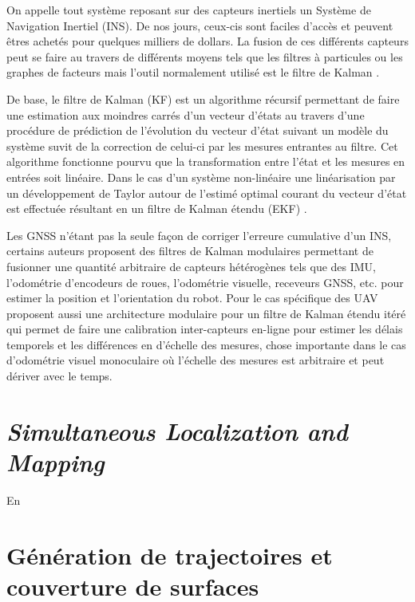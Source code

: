 On appelle tout système reposant sur des capteurs inertiels un Système de Navigation Inertiel (INS). De nos jours, ceux-cis sont faciles d'accès et peuvent êtres achetés pour quelques milliers de dollars. La fusion de ces différents capteurs peut se faire au travers de différents moyens tels que les filtres à particules \citep{Carvalho1997} ou les graphes de facteurs \citep{Indelman2012} mais l'outil normalement utilisé est le filtre de Kalman \citep{Noureldin2013}.

De base, le filtre de Kalman (KF) est un algorithme récursif permettant de faire une estimation aux moindres carrés d'un vecteur d'états au travers d'une procédure de prédiction de l'évolution du vecteur d'état suivant un modèle du système suvit de la correction de celui-ci par les mesures entrantes au filtre. Cet algorithme fonctionne pourvu que la transformation entre l'état et les mesures en entrées soit linéaire. Dans le cas d'un système non-linéaire une linéarisation par un développement de Taylor autour de l'estimé optimal courant du vecteur d'état est effectuée résultant en un filtre de Kalman étendu (EKF) \citep{Chui2017}.

Les GNSS n'étant pas la seule façon de corriger l'erreure cumulative d'un INS, certains auteurs proposent des filtres de Kalman modulaires permettant de fusionner une quantité arbitraire de capteurs hétérogènes tels que des IMU, l'odométrie d'encodeurs de roues, l'odométrie visuelle, receveurs GNSS, etc. \citep{MooreEkf2014} pour estimer la position et l'orientation du robot. Pour le cas spécifique des UAV \citep{Lynen2013} proposent aussi une architecture modulaire pour un filtre de Kalman étendu itéré qui permet de faire une calibration inter-capteurs en-ligne pour estimer les délais temporels et les différences en d'échelle des mesures, chose importante dans le cas d'odométrie visuel monoculaire où l'échelle des mesures est arbitraire et peut dériver avec le temps.

\section{\textit{Simultaneous Localization and Mapping}}\label{subsec:reconstruction}

En 

\section{Génération de trajectoires et couverture de surfaces}\label{subsec:generation}


